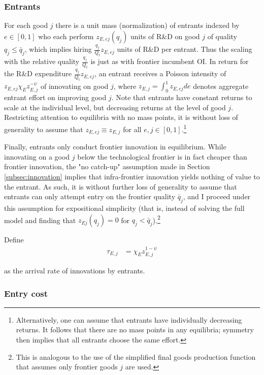 \documentclass[11pt,english]{article}
\theoremstyle{remark}
\begin{document}
\subsubsection{Entrants} \label{subsubsec:entrants}

For each good $j$ there is a unit mass (normalization) of entrants indexed by $e \in [0,1]$ who each perform $z_{E,ej}(q_j)$ units of R\&D on good $j$ of quality $q_j \le \bar{q}_{j}$, which implies hiring $\frac{q_j}{Q_t}z_{E,ej}$ units of R\&D per entrant. Thus the scaling with the relative quality $\frac{q_j}{Q_t}$ is just as with frontier incumbent OI. In return for the R\&D expenditure $\frac{q_j}{Q_t} z_{E,ej}$, an entrant receives a Poisson intensity of $z_{E,ej} \chi_E z_{E,j}^{-\psi}$ of innovating on good $j$, where $z_{E,j} = \int_0^1 z_{E,ej} de$ denotes aggregate entrant effort on improving good $j$. Note that entrants have constant returns to scale at the individual level, but decreasing returns at the level of good $j$. Restricting attention to equilibria with no mass points, it is without loss of generality to assume that $z_{E,ej} \equiv z_{E,j}$ for all $e,j \in [0,1]$.\footnote{Alternatively, one can assume that entrants have individually decreasing returns. It follows that there are no mass points in any equilibria; symmetry then implies that all entrants choose the same effort.}

Finally, entrants only conduct frontier innovation in equilibrium. While innovating on a good $j$ below the technological frontier is in fact cheaper than frontier innovation, the "no catch-up" assumption made in Section \ref{subsec:innovation} implies that infra-frontier innovation yields nothing of value to the entrant. As such, it is without further loss of generality to assume that entrants can only attempt entry on the frontier quality $\bar{q}_j$, and I proceed under this assumption for expositional simplicity (that is, instead of solving the full model and finding that $z_{Ej}(q_j) = 0$ for $q_j < \bar{q}_j$).\footnote{This is analogous to the use of the simplified final goods production function that assumes only frontier goods $j$ are used.}

Define
\begin{align*}
	\tau_{E,j} &= \chi_E z_{E,j}^{1-\psi}
\end{align*}

as the arrival rate of innovations by entrants.


\subsubsection{Entry cost}
\end{document}
